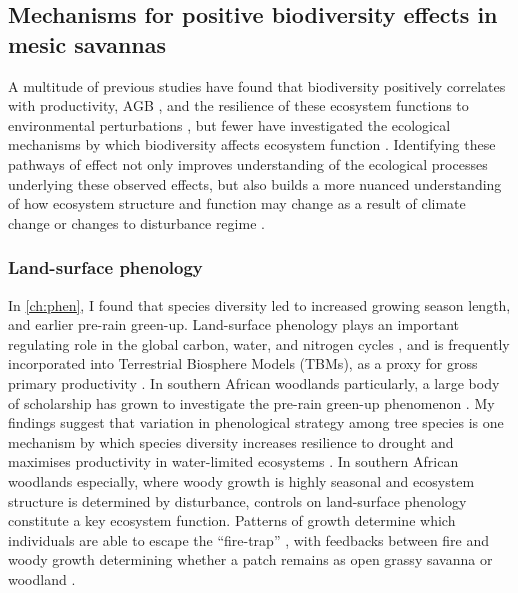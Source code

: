 \begin{refsection}
\subsection{Mechanisms for positive biodiversity effects in mesic savannas}
\label{discussion:ssec:mechanism}

A multitude of previous studies have found that biodiversity positively correlates with productivity, AGB \citep{Liang2016}, and the resilience of these ecosystem functions to environmental perturbations \citep{Mori2012}, but fewer have investigated the ecological mechanisms by which biodiversity affects ecosystem function \citep{Barry2019}. Identifying these pathways of effect not only improves understanding of the ecological processes underlying these observed effects, but also builds a more nuanced understanding of how ecosystem structure and function may change as a result of climate change or changes to disturbance regime \citep{Huston2014}.

\subsubsection{Land-surface phenology}
\label{discussion:sssec:phen}

In \autoref{ch:phen}, I found that species diversity led to increased growing season length, and earlier pre-rain green-up. Land-surface phenology plays an important regulating role in the global carbon, water, and nitrogen cycles \citep{Richardson2013}, and is frequently incorporated into Terrestrial Biosphere Models (TBMs), as a proxy for gross primary productivity \citep{Bloom2016}. In southern African woodlands particularly, a large body of scholarship has grown to investigate the pre-rain green-up phenomenon \citep{Ryan2017, Adole2018a}. My findings suggest that variation in phenological strategy among tree species is one mechanism by which species diversity increases resilience to drought and maximises productivity in water-limited ecosystems \citep{Stan2019, Morellato2016}. In southern African woodlands especially, where woody growth is highly seasonal and ecosystem structure is determined by disturbance, controls on land-surface phenology constitute a key ecosystem function. Patterns of growth determine which individuals are able to escape the ``fire-trap'' \citep{Dantas2013}, with feedbacks between fire and woody growth determining whether a patch remains as open grassy savanna or woodland \citep{Staver2011}.


\end{refsection}
